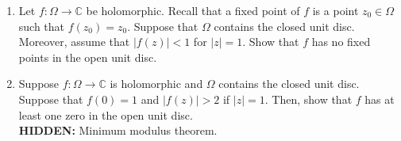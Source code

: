 \documentclass[12pt]{article}
\theoremstyle{definition}
\numberwithin{thm}{section}
\newcommand{\hint}[1]{\textbf{HIDDEN:} {\color[rgb]{0.95, 0.95, 0.95}#1}}
\begin{document}
\begin{enumerate}
	\item Let $f:\Omega\to\mathbb{C}$ be holomorphic. Recall that a fixed point of $f$ is a point $z_0 \in \Omega$ such that $f(z_0) = z_0.$ Suppose that $\Omega$ contains the closed unit disc. Moreover, assume that $|f(z)| < 1$ for $|z| = 1.$ Show that $f$ has no fixed points in the open unit disc.
	\item Suppose $f:\Omega\to\mathbb{C}$ is holomorphic and $\Omega$ contains the closed unit disc. Suppose that $f(0) = 1$ and $|f(z)| > 2$ if $|z| = 1.$ Then, show that $f$ has at least one zero in the open unit disc.\\
	\hint{Minimum modulus theorem.}
\end{enumerate}
\end{document}

